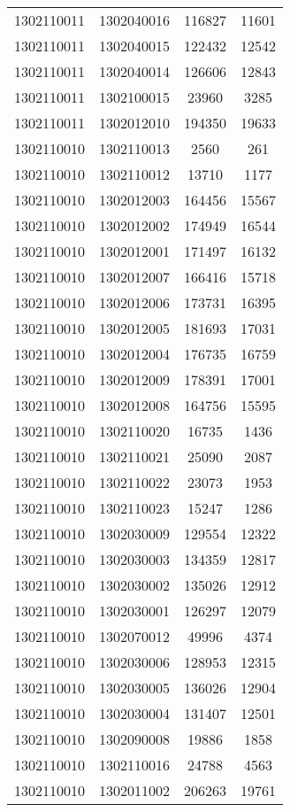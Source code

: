 \begin{longtable}[h]{llcc}
		1302110011 & 1302040016 & 116827 & 11601\\
		1302110011 & 1302040015 & 122432 & 12542\\
		1302110011 & 1302040014 & 126606 & 12843\\
		1302110011 & 1302100015 & 23960 & 3285\\
		1302110011 & 1302012010 & 194350 & 19633\\
		1302110010 & 1302110013 & 2560 & 261\\
		1302110010 & 1302110012 & 13710 & 1177\\
		1302110010 & 1302012003 & 164456 & 15567\\
		1302110010 & 1302012002 & 174949 & 16544\\
		1302110010 & 1302012001 & 171497 & 16132\\
		1302110010 & 1302012007 & 166416 & 15718\\
		1302110010 & 1302012006 & 173731 & 16395\\
		1302110010 & 1302012005 & 181693 & 17031\\
		1302110010 & 1302012004 & 176735 & 16759\\
		1302110010 & 1302012009 & 178391 & 17001\\
		1302110010 & 1302012008 & 164756 & 15595\\
		1302110010 & 1302110020 & 16735 & 1436\\
		1302110010 & 1302110021 & 25090 & 2087\\
		1302110010 & 1302110022 & 23073 & 1953\\
		1302110010 & 1302110023 & 15247 & 1286\\
		1302110010 & 1302030009 & 129554 & 12322\\
		1302110010 & 1302030003 & 134359 & 12817\\
		1302110010 & 1302030002 & 135026 & 12912\\
		1302110010 & 1302030001 & 126297 & 12079\\
		1302110010 & 1302070012 & 49996 & 4374\\
		1302110010 & 1302030006 & 128953 & 12315\\
		1302110010 & 1302030005 & 136026 & 12904\\
		1302110010 & 1302030004 & 131407 & 12501\\
		1302110010 & 1302090008 & 19886 & 1858\\
		1302110010 & 1302110016 & 24788 & 4563\\
		1302110010 & 1302011002 & 206263 & 19761\\

\end{longtable}
